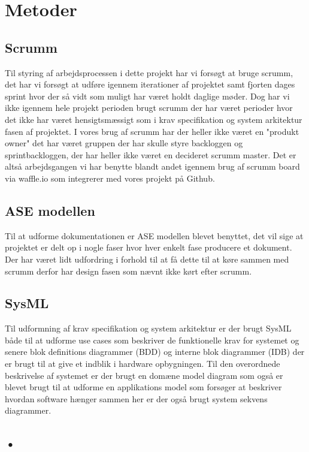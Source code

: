 \section{Metoder}
\subsection{Scrumm}
Til styring af arbejdsprocessen i dette projekt har vi forsøgt at bruge scrumm, det har vi forsøgt at udføre igennem iterationer af projektet samt fjorten dages sprint hvor der så vidt som muligt har været holdt daglige møder. Dog har vi ikke igennem hele projekt perioden brugt scrumm der har været perioder hvor det ikke har været hensigtsmæssigt som i krav specifikation og system arkitektur fasen af projektet. I vores brug af scrumm har der heller ikke været en "produkt owner" det har været gruppen der har skulle styre backloggen og sprintbackloggen, der har heller ikke været en decideret scrumm master. Det er altså arbejdsgangen vi har benytte blandt andet igennem brug af scrumm board via waffle.io som integrerer med vores projekt på Github. 

\subsection{ASE modellen}
Til at udforme dokumentationen er ASE modellen blevet benyttet, det vil sige at projektet er delt op i nogle faser hvor hver enkelt fase producere et dokument. Der har været lidt udfordring i forhold til at få dette til at køre sammen med scrumm derfor har design fasen som nævnt ikke kørt efter scrumm.

\subsection{SysML}
Til udformning af krav specifikation og system arkitektur er der brugt SysML både til at udforme use cases som beskriver de funktionelle krav for systemet og senere blok definitions diagrammer (BDD) og interne blok diagrammer (IDB) der er brugt til at give et indblik i hardware opbygningen. Til den overordnede beskrivelse af systemet er der brugt en domæne model diagram som også er blevet brugt til at udforme en applikations model som forsøger at beskriver hvordan software hænger sammen her er der også brugt system sekvens diagrammer.

\subsection{•}